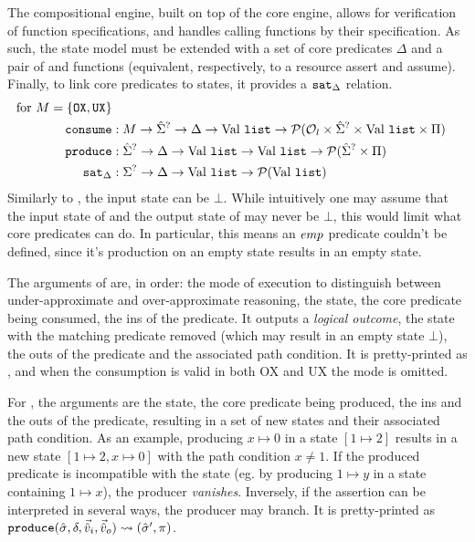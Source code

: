 The compositional engine, built on top of the core engine, allows for verification of function specifications, and handles calling functions by their specification. As such, the state model must be extended with a set of core predicates $\Delta$ and a pair of \consume{} and \produce{} functions (equivalent, respectively, to a resource assert and assume). Finally, to link core predicates to states, it provides a $\texttt{sat}_\Delta$ relation.
\begin{align*}
	\text{for }M=\{\texttt{OX}, \texttt{UX}\}\\
	\texttt{consume} &: M\rightarrow \hat{\Sigma}^? \rightarrow \Delta \rightarrow \text{Val}~\texttt{list} \rightarrow {\cal P}({\cal O}_l \times \hat{\Sigma}^? \times \text{Val}~\texttt{list} \times \Pi) \\
	\texttt{produce} &: \hat{\Sigma}^? \rightarrow \Delta \rightarrow \text{Val}~\texttt{list} \rightarrow \text{Val}~\texttt{list} \rightarrow {\cal P}(\hat{\Sigma}^? \times \Pi)\\
	\texttt{sat}_\Delta &:\Sigma^? \rightarrow \Delta \rightarrow \text{Val}~\texttt{list} \rightarrow {\cal P}(\text{Val}~\texttt{list})
\end{align*}
Similarly to \execac, the input state can be $\bot$. While intuitively one may assume that the input state of \consume{} and the output state of \produce{} may never be $\bot$, this would limit what core predicates can do. In particular, this means an $\textit{emp}$ predicate couldn't be defined, since it's production on an empty state results in an empty state.

The arguments of \consume{} are, in order: the mode of execution to distinguish between under-approximate and over-approximate reasoning, the state, the core predicate being consumed, the ins of the predicate. It outputs a \emph{logical outcome}, the state with the matching predicate removed (which may result in an empty state $\bot$), the outs of the predicate and the associated path condition. It is pretty-printed as , and when the consumption is valid in both OX and UX the mode is omitted.

For \produce{}, the arguments are the state, the core predicate being produced, the ins and the outs of the predicate, resulting in a set of new states and their associated path condition. As an example, producing $x \mapsto 0$ in a state $[1 \mapsto 2]$ results in a new state $[1\mapsto 2, x \mapsto 0]$ with the path condition $x \neq 1$. If the produced predicate is incompatible with the state (eg. by producing $1 \mapsto y$ in a state containing $1 \mapsto x$), the producer \emph{vanishes}. Inversely, if the assertion can be interpreted in several ways, the producer may branch. It is pretty-printed as $\texttt{produce}(\hat{\sigma},\delta,\vec{\hat{v}}_i,\vec{\hat{v}}_o)\rightsquigarrow (\hat{\sigma}', \pi)$.

